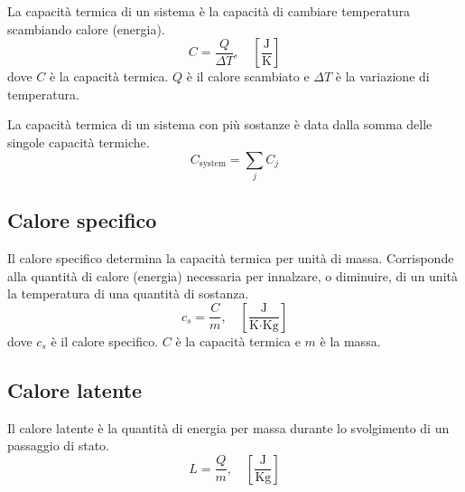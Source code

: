 \documentclass{article}
\begin{document}
La capacità termica di un sistema è la capacità di
cambiare temperatura scambiando calore (energia).
\[
    C=\frac{Q}{\Delta T}, \quad \left[\frac{\text{J}}{\text{K}}\right]
\]
dove \(C\) è la capacità termica.
\(Q\) è il calore scambiato e \(\Delta T\) è la variazione di temperatura.

La capacità termica di un sistema con più sostanze è data dalla somma
delle singole capacità termiche.
\[
    C_{\text{system}} = \sum_j C_j
\]

\subsection{Calore specifico}

Il calore specifico determina la capacità termica per unità di massa.
Corrisponde alla quantità di calore (energia) necessaria per innalzare,
o diminuire, di un unità la temperatura di una quantità di sostanza.
\[
    c_s = \frac{C}{m}, \quad \left[\frac{\text{J}}{\text{K}\cdot \text{Kg}}\right]
\]
dove \(c_s\) è il calore specifico. \(C\) è la capacità termica
e \(m\) è la massa.

\subsection{Calore latente}

Il calore latente è la quantità di energia per massa
durante lo svolgimento di un passaggio di stato.
\[
    L=\frac{Q}{m}, \quad \left[\frac{\text{J}}{\text{Kg}}\right]
\]
\end{document}
